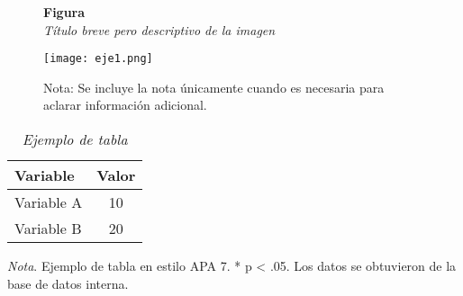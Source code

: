 \documentclass[12pt,letterpaper]{report}
\begin{document}
	\begin{figure}[ht]
		
		\textbf{Figura \thefigure}\\[0.5em]
		\textit{Título breve pero descriptivo de la imagen}\\[1em]
		\begin{center}
			
			\texttt{[image: eje1.png]}\\[1em]
		\end{center}
		
		
		\normalsize Nota: Se incluye la nota únicamente cuando es necesaria para aclarar información adicional.
				
	\end{figure}
	
	\begin{table}[ht]
		\captionsetup{justification=raggedright,singlelinecheck=false}
		\caption{\textit{Ejemplo de tabla}}
		\label{tab:variables} %
		\centering
		\begin{tabular}{l c}
			\hline
			\textbf{Variable} & \textbf{Valor} \\
			\hline
			Variable A        & 10 \\
			Variable B        & 20 \\
			\hline
		\end{tabular}
		
		\begin{flushleft}
			\textit{Nota}. Ejemplo de tabla en estilo APA 7. * p < .05.  
			Los datos se obtuvieron de la base de datos interna.
		\end{flushleft}
	\end{table}
	
	
	
\end{document}
